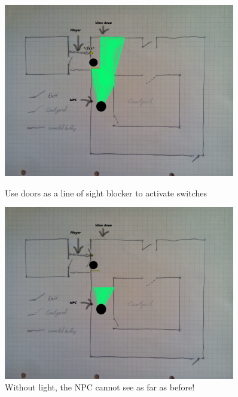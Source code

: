 \documentclass[12pt]{article}
\begin{document}
 \begin{figure}
       	\centering
       	\begin{minipage}{0.45\textwidth}
       		\centering
       		\includegraphics[width=0.9\textwidth]{Images/notgotcaught} %
       		\caption{Use doors as a line of sight blocker to activate switches}
       	\end{minipage}\hfill
       	\begin{minipage}{0.45\textwidth}
       		\centering
       		\includegraphics[width=0.9\textwidth]{Images/lightsofflineofsight} %
       		\caption{Without light, the NPC cannot see as far as before!}
      	\end{minipage}
 \end{figure}
                    
 

  
\end{document}
